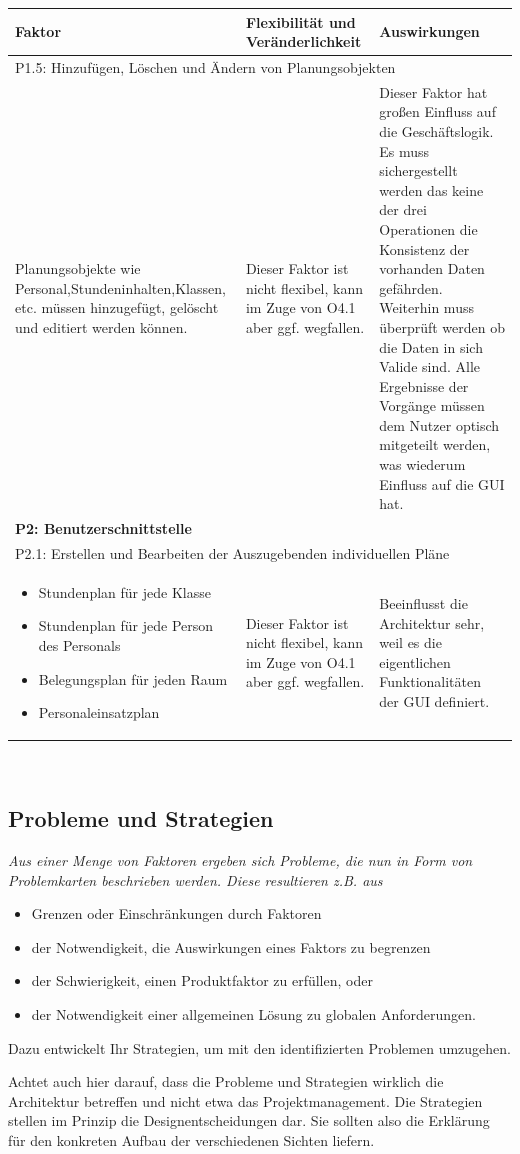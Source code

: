 \documentclass[fontsize=12pt,paper=a4,twoside]{scrartcl}
\begin{document}
\begin{tabularx}{\textwidth}{|X|X|X|}
\hline
\textbf{Faktor} & \textbf{Flexibilität und Veränderlichkeit} & \textbf{Auswirkungen}\\\hline
\hline
\hline
\multicolumn{3}{|l|}{P1.5: Hinzufügen, Löschen und Ändern von Planungsobjekten}\\\hline
Planungsobjekte wie Personal,Stundeninhalten,Klassen, etc. müssen hinzugefügt, gelöscht und editiert werden können.& Dieser Faktor ist nicht flexibel, kann im Zuge von O4.1 aber ggf. wegfallen. & Dieser Faktor hat großen Einfluss auf die Geschäftslogik. Es muss sichergestellt werden das keine der drei Operationen die Konsistenz der vorhanden Daten gefährden. Weiterhin muss überprüft werden ob die Daten in sich Valide sind. Alle Ergebnisse der Vorgänge müssen dem Nutzer optisch mitgeteilt werden, was wiederum Einfluss auf die GUI hat. \\\hline
\multicolumn{3}{|l|}{\textbf{P2: Benutzerschnittstelle}}\\\hline
\multicolumn{3}{|l|}{P2.1: Erstellen und Bearbeiten der Auszugebenden individuellen Pläne}\\\hline
\begin{itemize}
\item Stundenplan für jede Klasse
\item Stundenplan für jede Person des Personals
\item Belegungsplan für jeden Raum
\item Personaleinsatzplan 
\end{itemize} & Dieser Faktor ist nicht flexibel, kann im Zuge von O4.1 aber ggf. wegfallen. & Beeinflusst die Architektur sehr, weil es die eigentlichen Funktionalitäten der GUI definiert.
\\\hline
\end{tabularx}\\

\newpage
\subsection{Probleme und Strategien}
\label{sec:strategien}

{\it Aus einer Menge von Faktoren ergeben sich Probleme, die nun in
  Form von Problemkarten beschrieben werden. Diese resultieren
  z.B. aus
  \begin{itemize}
  \item Grenzen oder Einschränkungen durch Faktoren
  \item der Notwendigkeit, die Auswirkungen eines Faktors zu begrenzen
  \item der Schwierigkeit, einen Produktfaktor zu erfüllen, oder
  \item der Notwendigkeit einer allgemeinen Lösung zu globalen
    Anforderungen.
  \end{itemize}
  Dazu entwickelt Ihr Strategien, um mit den identifizierten Problemen
  umzugehen.

  Achtet auch hier darauf, dass die Probleme und Strategien wirklich
  die Architektur betreffen und nicht etwa das Projektmanagement. Die
  Strategien stellen im Prinzip die Designentscheidungen dar. Sie
  sollten also die Erklärung für den konkreten Aufbau der
  verschiedenen Sichten liefern.}
\end{document}
